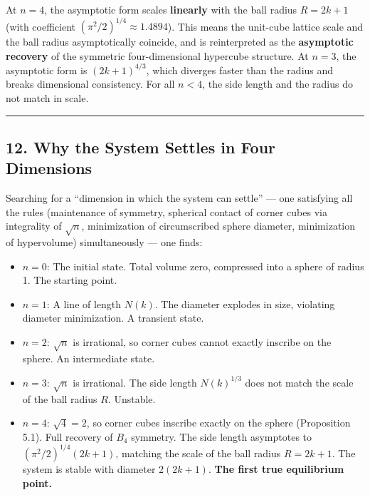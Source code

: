 \documentclass[a4paper,11pt]{article}
\theoremstyle{definition}
\providecommand{\tightlist}{\setlength{\itemsep}{0pt}\setlength{\parskip}{0pt}}
\begin{document}
At \(n = 4\), the asymptotic form scales \textbf{linearly} with the ball
radius \(R = 2k+1\) (with coefficient
\((\pi^2/2)^{1/4} \approx 1.4894\)). This means the unit-cube lattice
scale and the ball radius asymptotically coincide, and is reinterpreted
as the \textbf{asymptotic recovery} of the symmetric four-dimensional
hypercube structure. At \(n = 3\), the asymptotic form is
\((2k+1)^{4/3}\), which diverges faster than the radius and breaks
dimensional consistency. For all \(n < 4\), the side length and the
radius do not match in scale.

\begin{center}\rule{0.5\linewidth}{0.5pt}\end{center}

\subsection{12. Why the System Settles in Four
Dimensions}\label{why-the-system-settles-in-four-dimensions}

Searching for a ``dimension in which the system can settle'' --- one
satisfying all the rules (maintenance of symmetry, spherical contact of
corner cubes via integrality of \(\sqrt{n}\), minimization of
circumscribed sphere diameter, minimization of hypervolume)
simultaneously --- one finds:

\begin{itemize}
\tightlist
\item
  \textbf{\(n = 0\)}: The initial state. Total volume zero, compressed
  into a sphere of radius 1. The starting point.
\item
  \textbf{\(n = 1\)}: A line of length \(N(k)\). The diameter explodes
  in size, violating diameter minimization. A transient state.
\item
  \textbf{\(n = 2\)}: \(\sqrt{n}\) is irrational, so corner cubes cannot
  exactly inscribe on the sphere. An intermediate state.
\item
  \textbf{\(n = 3\)}: \(\sqrt{n}\) is irrational. The side length
  \(N(k)^{1/3}\) does not match the scale of the ball radius \(R\).
  Unstable.
\item
  \textbf{\(n = 4\)}: \(\sqrt{4} = 2\), so corner cubes inscribe exactly
  on the sphere (Proposition 5.1). Full recovery of \(B_4\) symmetry.
  The side length asymptotes to \((\pi^2/2)^{1/4}(2k+1)\), matching the
  scale of the ball radius \(R = 2k+1\). The system is stable with
  diameter \(2(2k+1)\). \textbf{The first true equilibrium point.}
\end{itemize}
\end{document}
